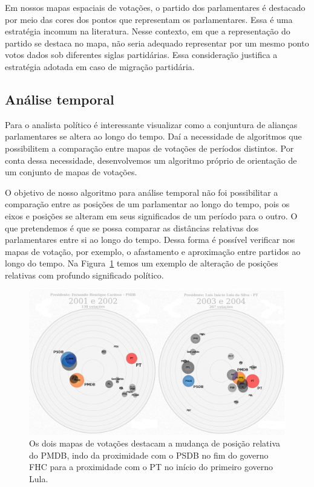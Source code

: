 \documentclass[
	article,			%
	12pt,				%
	oneside,			%
	a4paper,			%
	english,			%
	brazil,				%
	sumario=tradicional,
	oldfontcommands %
	]{abntex2}
\begin{document}
Em nossos mapas espaciais de votações, o partido dos parlamentares é destacado por meio das cores dos pontos que representam os parlamentares. Essa é uma estratégia incomum na literatura. Nesse contexto, em que a representação do partido se destaca no mapa, não seria adequado representar por um mesmo ponto votos dados sob diferentes siglas partidárias. Essa consideração justifica a estratégia adotada em caso de migração partidária.

\subsection{Análise temporal}

Para o analista político é interessante visualizar como a conjuntura de alianças parlamentares se altera ao longo do tempo. Daí a necessidade de algoritmos que possibilitem a comparação entre mapas de votações de períodos distintos. Por conta dessa necessidade, desenvolvemos um algoritmo próprio de orientação de um conjunto de mapas de votações.

O objetivo de nosso algoritmo para análise temporal não foi possibilitar a comparação entre as posições de um parlamentar ao longo do tempo, pois os eixos e posições se alteram em seus significados de um período para o outro. O que pretendemos é que se possa comparar as distâncias relativas dos parlamentares entre si ao longo do tempo. Dessa forma é possível verificar nos mapas de votação, por exemplo, o afastamento e aproximação entre partidos ao longo do tempo. Na Figura~\ref{fig:fhc2-lula1} temos um exemplo de alteração de posições relativas com profundo significado político. \\

\begin{figure}[h]
  \centering
  \includegraphics[scale=0.37]{figs/fhc2-lula1.png}
  \caption{Os dois mapas de votações destacam a mudança de posição relativa do PMDB, indo da proximidade com o PSDB no fim do governo FHC para a proximidade com o PT no início do primeiro governo Lula.}
  \label{fig:fhc2-lula1}
\end{figure}
\end{document}
